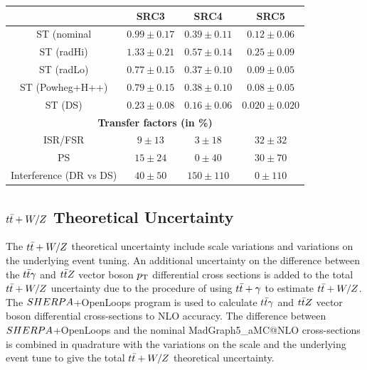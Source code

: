 \begin{table}[!h]
\begin{center}
        \begin{tabular}{|c|c|c|c|}
        \noalign{\smallskip}\noalign{\smallskip}\hline
        \hline
         & SRC3 & SRC4 & SRC5\\ \hline
         \hline
          ST (nominal&         $0.99\pm 0.17$&         $0.39\pm 0.11$&         $0.12\pm 0.06$\\
          ST  (radHi)&         $1.33\pm 0.21$&         $0.57\pm 0.14$&         $0.25\pm 0.09$\\
          ST (radLo)&         $0.77\pm 0.15$&         $0.37\pm 0.10$&         $0.09\pm 0.05$\\
	ST  (Powheg+H++)&         $0.79\pm 0.15$&         $0.38\pm 0.10$&         $0.08\pm 0.05$\\
	ST  (DS)&         $0.23\pm 0.08$&         $0.16\pm 0.06$&         $0.020\pm 0.020$\\
          \hline \hline 
          \multicolumn{4}{c}{\bf Transfer factors (in \%)} \\ \hline
          ISR/FSR&       $9\pm13$&       $3\pm18$&       $32\pm32$\\
          PS &      $15\pm24$&      $0\pm40$&       $30\pm70$\\
          Interference (DR vs DS)  &      $40\pm50$&      $150\pm110$&    $0\pm110$\\
          \hline
        \end{tabular}
        
    \end{center}

  \end{table}


\subsection{$t\bar{t}+W/Z$ Theoretical Uncertainty}

\indent The $t\bar{t}+W/Z$ theoretical uncertainty include scale variations and variations on the underlying event tuning.  An additional uncertainty on the difference between the $t\bar{t}\gamma$ and $t\bar{t} Z$ vector boson $p_{\mathrm{T}}$ differential cross sections is added to the total $t\bar{t}+W/Z$ uncertainty due to the procedure of using $t\bar{t}+\gamma$ to estimate $t\bar{t}+W/Z$.  The $SHERPA$+OpenLoops program\cite{OpenLoops} is used to calculate $t\bar{t} \gamma$ and $t\bar{t} Z$ vector boson differential cross-sections to NLO accuracy.  The difference between $SHERPA$+OpenLoops and the nominal {\sc MadGraph5\_aMC\/@NLO} cross-sections is combined in quadrature with the variations on the scale and the underlying event tune to give the total $t\bar{t}+W/Z$ theoretical uncertainty. \\

